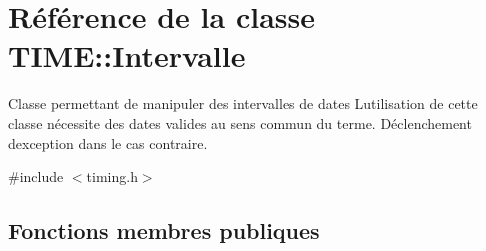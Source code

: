 \hypertarget{class_t_i_m_e_1_1_intervalle}{}\section{Référence de la classe T\+I\+M\+E\+:\+:Intervalle}
\label{class_t_i_m_e_1_1_intervalle}


Classe permettant de manipuler des intervalles de dates L\textquotesingle{}utilisation de cette classe nécessite des dates valides au sens commun du terme. Déclenchement d\textquotesingle{}exception dans le cas contraire.  




{\ttfamily \#include $<$timing.\+h$>$}

\subsection*{Fonctions membres publiques}
